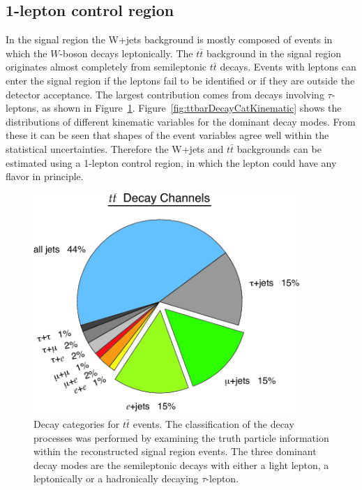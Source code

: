 \subsection{1-lepton control region}
\par In the signal region the W+jets background is mostly composed of events in which the $W$-boson decays leptonically. 
The $t\bar{t}$ background in the signal region originates almost completely from semileptonic $t\bar{t}$ decays. 
Events with leptons can enter the signal region if the leptons fail to be identified or if they are outside the detector acceptance. 
The largest contribution comes from decays involving $\tau$-leptons, as shown in Figure~\ref{fig:ttbarDecayCat}. 
Figure~\ref{fig:ttbarDecayCatKinematic} shows the distributions of different kinematic variables for the dominant decay modes. 
From these it can be seen that shapes of the event variables agree well within the statistical uncertainties. 
Therefore the W+jets and $t\bar{t}$ backgrounds can be estimated using a 1-lepton control region, in which the lepton could have any flavor in principle.

\begin{figure}[h]
    \centering
    \includegraphics[width=0.9\textwidth]{chapters/c7/figures/ttbar-decay-modes.png}
    \caption{Decay categories for $t\bar{t}$ events. The classification of the decay processes was performed by examining the truth particle information within the reconstructed signal region events. The three dominant decay modes are the semileptonic decays with either a light lepton, a leptonically or a hadronically decaying $\tau$-lepton.}
    \label{fig:ttbarDecayCat}
\end{figure}

